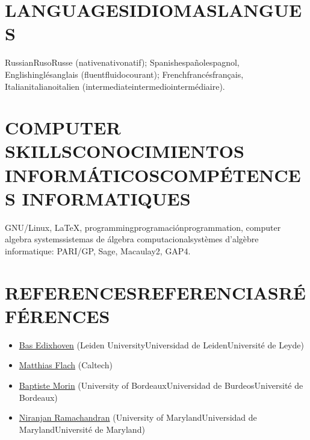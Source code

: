 \documentclass{article}
\newcommand{\biling}[3]{\ifdefined\english#1\fi\ifdefined\spanish#2\fi\ifdefined\french#3\fi}
\begin{document}
{\color{RoyalBlue}\section*{\biling{LANGUAGES}{IDIOMAS}{LANGUES}}}

\biling{Russian}{Ruso}{Russe} (\biling{native}{nativo}{natif});
\biling{Spanish}{español}{espagnol},
\biling{English}{inglés}{anglais} (\biling{fluent}{fluido}{courant});
\biling{French}{francés}{français},
\biling{Italian}{italiano}{italien} (\biling{intermediate}{intermedio}{intermédiaire}).

\vspace{1em}

{\color{RoyalBlue}\section*{\biling{COMPUTER SKILLS}{CONOCIMIENTOS INFORMÁTICOS}{COMPÉTENCES INFORMATIQUES}}}

GNU/Linux,
LaTeX,
\biling{programming}{programación}{programmation},
\biling{computer algebra systems}{sistemas de álgebra computacional}{systèmes d'algèbre informatique}:
PARI/GP,
Sage,
Macaulay2,
GAP4.

\vspace{1em}

{\color{RoyalBlue}\section*{\biling{REFERENCES}{REFERENCIAS}{RÉFÉRENCES}}}

\begin{itemize}
\item \href{https://www.math.leidenuniv.nl/~edix/}{Bas Edixhoven} (\biling{Leiden University}{Universidad de Leiden}{Université de Leyde})
\item \href{http://www.math.caltech.edu/~flach/}{Matthias Flach} (Caltech)
\item \href{https://www.math.u-bordeaux.fr/~bmorin/}{Baptiste Morin} (\biling{University of Bordeaux}{Universidad de Burdeos}{Université de Bordeaux})
\item \href{https://www.math.umd.edu/~atma/}{Niranjan Ramachandran} (\biling{University of Maryland}{Universidad de Maryland}{Université de Maryland})
\end{itemize}
\end{document}
